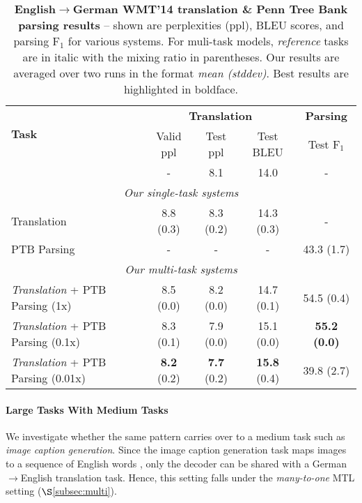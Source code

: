 \begin{table}[tbh!]
\centering
\begin{tabular}{l|c|c|c|c}
\multirow{ 2}{*}{\bf{Task}} & \multicolumn{3}{c|}{{\bf Translation}} &
\multicolumn{1}{c}{{\bf
Parsing}}\\
  \cline{2-5}
  & Valid ppl & Test ppl & Test BLEU & Test F$_1$ \\
  \hline
\citep{luong15attn} & - & 8.1 & 14.0 & -  \\
  \hline
\multicolumn{5}{c}{{\it Our single-task systems}} \\
  \hline
Translation & 8.8 (0.3) & 8.3 (0.2) & 14.3 (0.3) & -\\
  \hline
PTB Parsing & - & - & - & 43.3 (1.7) \\
  \hline
\multicolumn{5}{c}{{\it Our multi-task systems}} \\
  \hline
{\it Translation} + PTB Parsing (1x) &  8.5 (0.0) & 8.2 (0.0) & 14.7 (0.1) & 54.5 (0.4) \\
  \hline
{\it Translation} + PTB Parsing (0.1x) &  8.3 (0.1) & 7.9 (0.0) & 15.1 (0.0) &
{\bf 55.2 (0.0)}\\
  \hline
{\it Translation} + PTB Parsing (0.01x) &  {\bf 8.2} (0.2) & {\bf 7.7} (0.2) & {\bf
15.8} (0.4) & 39.8 (2.7) \\
\end{tabular}
\caption{{\bf English$\rightarrow$German WMT'14 translation \& Penn Tree Bank parsing results} --
shown are perplexities (ppl), BLEU scores, and parsing F$_1$ for various systems. For muli-task
models, {\it reference} tasks are in
italic with the mixing ratio in parentheses. Our results are averaged over two
runs
in the format {\it mean (stddev)}. Best results are
highlighted in boldface.}
\label{t:big_small}
\end{table}

\paragraph{Large Tasks With Medium Tasks} %
We investigate whether the same pattern carries over to a medium task
such as {\it image caption generation}. Since the image caption
generation task maps images to a sequence of
English words \citep{vinyals15caption,xu15}, only the decoder can be
shared with a German$\rightarrow$English translation task. Hence, this
setting falls under the {\it many-to-one} MTL setting ($\S$\ref{subsec:multi}).

